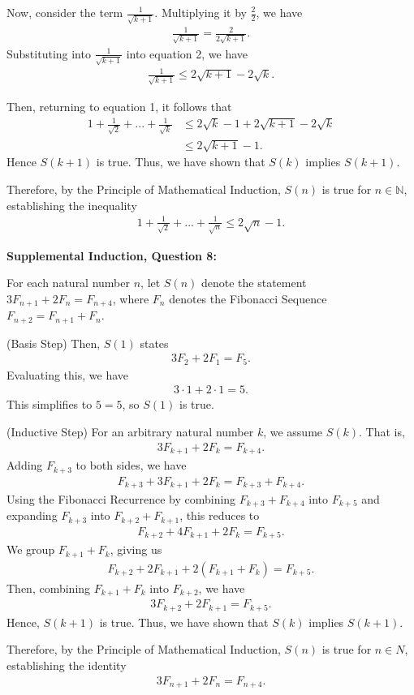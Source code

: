 \documentclass[12pt]{article}
\begin{document}
Now, consider the term $\frac{1}{\sqrt{k+1}}$.
Multiplying it by $\frac{2}{2}$, we have
\begin{align*}
    \frac{1}{\sqrt{k+1}} = \frac{2}{2\sqrt{k+1}}.
\end{align*}
Substituting into $\frac{1}{\sqrt{k+1}}$ into equation 2, we have
\begin{align*}
    \frac{1}{\sqrt{k+1}} \leq 2\sqrt{k+1} - 2\sqrt{k}.
\end{align*}

Then, returning to equation 1, it follows that
\begin{align*}
    1 + \frac{1}{\sqrt{2}} + ... + \frac{1}{\sqrt{k}} & \leq 2\sqrt{k} - 1 + 2\sqrt{k+1} - 2\sqrt{k} \\
                                                      & \leq 2\sqrt{k+1} - 1.
\end{align*}
Hence $S(k+1)$ is true. Thus, we have shown that $S(k)$ implies $S(k+1)$.

Therefore, by the Principle of Mathematical Induction, $S(n)$ is true for $n\in\mathbb{N}$, establishing the inequality
\begin{align*}
    1 + \frac{1}{\sqrt{2}} + ... + \frac{1}{\sqrt{n}} \leq 2\sqrt{n} - 1.
\end{align*}

\noindent \textbf{Supplemental Induction, Question 8:}

For each natural number $n$, let $S(n)$ denote the statement
$3F_{n+1} + 2F_n = F_{n+4}$, where $F_n$ denotes the Fibonacci Sequence $F_{n+2} = F_{n+1} + F_{n}$.

(Basis Step) Then, $S(1)$ states
\begin{align*}
    3F_{2} + 2F_{1} = F_{5}.
\end{align*}
Evaluating this, we have
\begin{align*}
    3 \cdot 1 + 2 \cdot 1 = 5.
\end{align*}
This simplifies to $5=5$, so $S(1)$ is true.

(Inductive Step) For an arbitrary natural number $k$, we assume $S(k)$. That is,
\begin{align*}
    3F_{k+1} + 2F_k = F_{k+4}.
\end{align*}
Adding $F_{k+3}$ to both sides, we have
\begin{align*}
    F_{k+3} + 3F_{k+1} + 2F_k  = F_{k+3} + F_{k+4}.
\end{align*}
Using the Fibonacci Recurrence by combining $F_{k+3} + F_{k+4}$ into $F_{k+5}$ and expanding $F_{k+3}$ into $F_{k+2}+F_{k+1}$, this reduces to
\begin{align*}
    F_{k+2} + 4F_{k+1} + 2F_k  = F_{k+5}.
\end{align*}
We group $F_{k+1} + F_k$, giving us
\begin{align*}
    F_{k+2} + 2F_{k+1}+ 2(F_{k+1} + F_k)  = F_{k+5}.
\end{align*}
Then, combining $F_{k+1} + F_k$ into $F_{k+2}$, we have
\begin{align*}
    3F_{k+2} + 2F_{k+1}  = F_{k+5}.
\end{align*}
Hence, $S(k+1)$ is true. Thus, we have shown that $S(k)$ implies $S(k+1)$.

Therefore, by the Principle of Mathematical Induction, $S(n)$ is true for $n\in{N}$, establishing the identity
\begin{align*}
    3F_{n+1} + 2F_n = F_{n+4}.
\end{align*}
\end{document}

